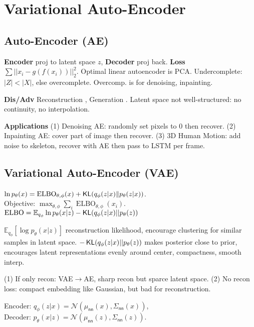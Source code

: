 \section{Variational Auto-Encoder}

\subsection*{Auto-Encoder (AE)}

\textbf{Encoder} proj to latent space $z$, \textbf{Decoder} proj back. \textbf{Loss} \(\sum ||x_i - g(f(x_i))||_2^2\).
Optimal linear autoencoder is PCA. Undercomplete: $|Z| < |X|$, else overcomplete. Overcomp. is for denoising, inpainting.

\textbf{Dis/Adv} Reconstruction \Checkmark, Generation \XSolidBrush. Latent space not well-structured: no continuity, no interpolation.

\textbf{Applications} (1) Denoising AE: randomly set pixels to 0 then recover. (2) Inpainting AE: cover part of image then recover. (3) 3D Human Motion: add noise to skeleton, recover with AE then pass to LSTM per frame.



\subsection*{Variational Auto-Encoder (VAE)}
\begin{small}
\(\ln p_{\theta}({x}) = \operatorname{ELBO}_{\theta, \phi}({x}) + \operatorname{\mathsf{KL}}(q_{\phi}(z | {x}) \| p_{\theta}(z | {x}))\). \\
Objective: \(\max_{\theta, \phi} \sum_i \operatorname{ELBO}_{\theta, \phi}({x_i})\).\\
\( \operatorname{ELBO}= \mathbb{E}_{q_{\phi}}\ln p_{\theta}(x | z) - \operatorname{\mathsf{KL}} (q_{\phi}(z | x)|| p_{\theta}(z))\)
\end{small}


\(\mathbb{E}_{q_{\phi}}[\log p_{\theta}(x | z)]\) reconstruction likelihood, encourage clustering for similar samples in latent space. \(-\operatorname{\mathsf{KL}}(q_{\phi}(z | x)|| p_{\theta}(z))\) makes posterior close to prior, encourages latent representations evenly around center, compactness, smooth interp.

(1) If only recon: VAE\(\to\)AE, sharp recon but sparce latent space. (2) No recon loss: compact embedding like Gaussian, but bad for reconstruction.

Encoder: \(q_{\phi}(z | x) = \mathcal{N}(\mu_{\mathsf{nn}}(x), \Sigma_{\mathsf{nn}}(x))\), \\
Decoder: \(p_{\theta}(x | z) = \mathcal{N}(\mu_{\mathsf{nn}}(z), \Sigma_{\mathsf{nn}}(z))\).

